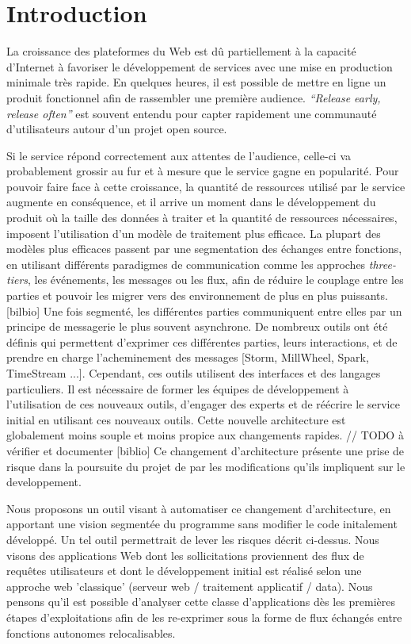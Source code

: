 \section{Introduction}

La croissance des plateformes du Web est dû partiellement à la capacité d'Internet à favoriser le développement de services avec une mise en production minimale très rapide.
En quelques heures, il est possible de mettre en ligne un produit fonctionnel afin de rassembler une première audience.
\textit{``Release early, release often''} est souvent entendu pour capter rapidement une communauté d'utilisateurs autour d'un projet open source.

Si le service répond correctement aux attentes de l'audience, celle-ci va probablement grossir au fur et à mesure que le service gagne en popularité.
Pour pouvoir faire face à cette croissance, la quantité de ressources utilisé par le service augmente en conséquence, et il arrive un moment dans le développement du produit où la taille des données à traiter et la quantité de ressources nécessaires, imposent l'utilisation d'un modèle de traitement plus efficace.
La plupart des modèles plus efficaces passent par une segmentation des échanges entre fonctions, en utilisant différents paradigmes de communication comme les approches \textit{three-tiers}, les événements, les messages ou les flux, afin de réduire le couplage entre les parties et pouvoir les migrer vers des environnement de plus en plus puissants. [bilbio]
Une fois segmenté, les différentes parties communiquent entre elles par un principe de messagerie le plus souvent asynchrone.
De nombreux outils ont été définis qui permettent d'exprimer ces différentes parties, leurs interactions, et de prendre en charge l'acheminement des messages [Storm, MillWheel, Spark, TimeStream ...].
Cependant, ces outils utilisent des interfaces et des langages particuliers. Il est nécessaire de former les équipes de développement à l'utilisation de ces nouveaux outils, d'engager des experts et de réécrire le service initial en utilisant ces nouveaux outils.
Cette nouvelle architecture est globalement moins souple et moins propice aux changements rapides. // TODO à vérifier et documenter [biblio]
Ce changement d'architecture présente une prise de risque dans la poursuite du projet de par les modifications qu'ils impliquent sur le developpement.

Nous proposons un outil visant à automatiser ce changement d'architecture, en apportant une vision segmentée du programme sans modifier le code initalement développé.
Un tel outil permettrait de lever les risques décrit ci-dessus.
Nous visons des applications Web dont les sollicitations proviennent des flux de requêtes utilisateurs et dont le développement initial est réalisé selon une approche web 'classique' (serveur web / traitement applicatif / data).
Nous pensons qu'il est possible d'analyser cette classe d'applications dès les premières étapes d'exploitations afin de les re-exprimer sous la forme de flux échangés entre fonctions autonomes relocalisables.

